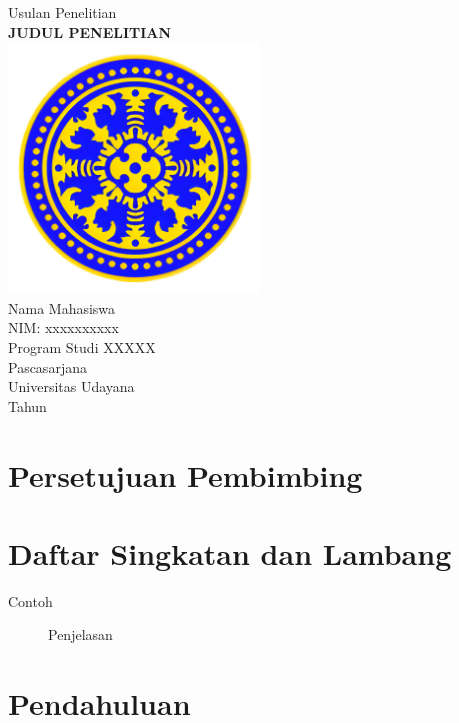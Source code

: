\documentclass[12pt, a4paper]{book}
\begin{document}
\frontmatter

\begin{titlepage}
    \centering
    \vspace*{2cm}
    {\LARGE Usulan Penelitian}\\[1cm]
    {\Huge \textbf{JUDUL PENELITIAN}}\\[2cm]
    \includegraphics[width=0.5\textwidth]{logo.png}\\[1cm]
    {\Large Nama Mahasiswa}\\[0.5cm]
    {\large NIM: xxxxxxxxxx}\\[2cm]
    {\Large Program Studi XXXXX}\\[0.5cm]
    {\Large Pascasarjana}\\[0.5cm]
    {\Large Universitas Udayana}\\[1cm]
    {\Large Tahun}
\end{titlepage}

\chapter*{Persetujuan Pembimbing}

\tableofcontents
\listoftables
\listoffigures
\chapter*{Daftar Singkatan dan Lambang}
\begin{description}
    \item[Contoh] Penjelasan
\end{description}

\mainmatter

\chapter{Pendahuluan}
\end{document}
